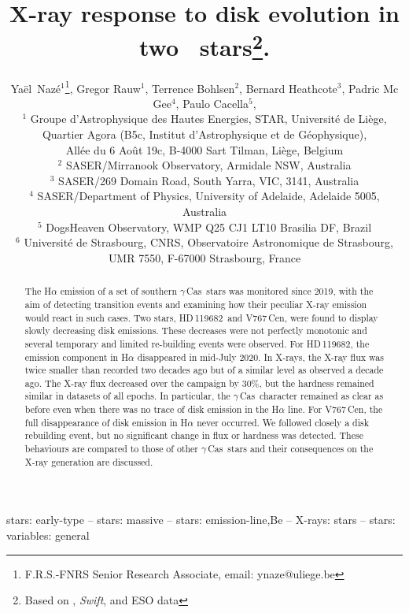 \documentclass[a4paper,fleqn,usenatbib]{mnras}
\title[Disk changes in 2 \gc ]{X-ray response to disk evolution in two \gc\ stars\thanks{Based on \xmm, {\it Swift}, and ESO data}. }
\author[Y. Naz\'e et al.]{Ya\"el~Naz\'e$^1$\thanks{F.R.S.-FNRS Senior Research Associate, email: ynaze@uliege.be}, Gregor Rauw$^1$, Terrence Bohlsen$^2$, Bernard Heathcote$^3$, Padric Mc Gee$^4$, Paulo Cacella$^5$, \newauthor{and Christian Motch$^6$}
\\
$^1$ Groupe d'Astrophysique des Hautes Energies, STAR, Universit\'e de Li\`ege, Quartier Agora (B5c, Institut d'Astrophysique et de G\'eophysique), \\
All\'ee du 6 Ao\^ut 19c, B-4000 Sart Tilman, Li\`ege, Belgium\\
$^2$ SASER/Mirranook Observatory, Armidale NSW, Australia\\
$^3$ SASER/269 Domain Road, South Yarra, VIC, 3141, Australia\\
$^4$ SASER/Department of Physics, University of Adelaide, Adelaide 5005, Australia\\
$^5$ DogsHeaven Observatory, WMP Q25 CJ1 LT10 Brasilia DF, Brazil\\
$^6$ Universit\'e de Strasbourg, CNRS, Observatoire Astronomique de Strasbourg, UMR 7550, F-67000 Strasbourg, France
}
\newcommand{\gc}{$\gamma$\,Cas}
\newcommand{\hd}{HD\,119682}
\newcommand{\vc}{V767\,Cen}
\begin{document}
\label{firstpage}
\pagerange{\pageref{firstpage}--\pageref{lastpage}}
\maketitle

\begin{abstract}
The H$\alpha$ emission of a set of southern \gc\ stars was monitored since 2019, with the aim of detecting transition events and examining how their peculiar X-ray emission would react in such cases. Two stars, \hd\ and \vc, were found to display slowly decreasing disk emissions. These decreases were not perfectly monotonic and several temporary and limited re-building events were observed. For \hd, the emission component in H$\alpha$ disappeared in mid-July 2020. In X-rays, the X-ray flux was twice smaller than recorded two decades ago but of a similar level as observed a decade ago. The X-ray flux decreased over the campaign by 30\%, but the hardness remained similar in datasets of all epochs. In particular, the \gc\ character remained as clear as before even when there was no trace of disk emission in the H$\alpha$ line. For \vc, the full disappearance of disk emission in H$\alpha$ never occurred. We followed closely a disk rebuilding event, but no significant change in flux or hardness was detected. These behaviours are compared to those of other \gc\ stars and their consequences on the X-ray generation are discussed.  
\end{abstract}

\begin{keywords}
stars: early-type -- stars: massive -- stars: emission-line,Be -- X-rays: stars -- stars: variables: general
\end{keywords}
\end{document}

